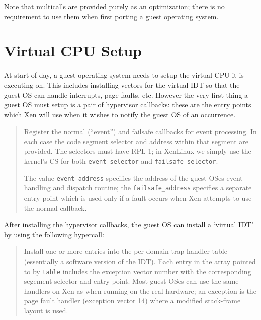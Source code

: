 \documentclass[11pt,twoside,final,openright]{xenstyle}
\begin{document}
Note that multicalls are provided purely as an optimization; there is
no requirement to use them when first porting a guest operating
system.


\section{Virtual CPU Setup} 

At start of day, a guest operating system needs to setup the virtual
CPU it is executing on. This includes installing vectors for the
virtual IDT so that the guest OS can handle interrupts, page faults,
etc. However the very first thing a guest OS must setup is a pair 
of hypervisor callbacks: these are the entry points which Xen will
use when it wishes to notify the guest OS of an occurrence. 

\begin{quote}

Register the normal (``event'') and failsafe callbacks for 
event processing. In each case the code segment selector and 
address within that segment are provided. The selectors must
have RPL 1; in XenLinux we simply use the kernel's CS for both 
{\tt event\_selector} and {\tt failsafe\_selector}.

The value {\tt event\_address} specifies the address of the guest OSes
event handling and dispatch routine; the {\tt failsafe\_address}
specifies a separate entry point which is used only if a fault occurs
when Xen attempts to use the normal callback. 
\end{quote} 


After installing the hypervisor callbacks, the guest OS can 
install a `virtual IDT' by using the following hypercall: 

\begin{quote} 

Install one or more entries into the per-domain 
trap handler table (essentially a software version of the IDT). 
Each entry in the array pointed to by {\tt table} includes the 
exception vector number with the corresponding segement selector 
and entry point. Most guest OSes can use the same handlers on 
Xen as when running on the real hardware; an exception is the 
page fault handler (exception vector 14) where a modified 
stack-frame layout is used. 


\end{quote} 
\end{document}
